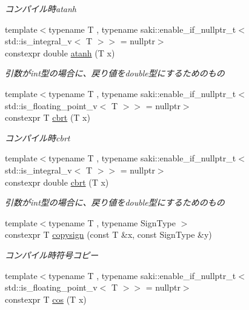 \begin{DoxyCompactItemize}
\begin{DoxyCompactList}\small\item\em コンパイル時atanh \end{DoxyCompactList}\item 
{\footnotesize template$<$typename T , typename saki\+::enable\+\_\+if\+\_\+nullptr\+\_\+t$<$ std\+::is\+\_\+integral\+\_\+v$<$ T $>$$>$  = nullptr$>$ }\\constexpr double \mbox{\hyperlink{namespacesaki_a1b7d87f99b61600e1201b10de467200f}{atanh}} (T x)
\begin{DoxyCompactList}\small\item\em 引数がint型の場合に、戻り値をdouble型にするためのもの \end{DoxyCompactList}\item 
{\footnotesize template$<$typename T , typename saki\+::enable\+\_\+if\+\_\+nullptr\+\_\+t$<$ std\+::is\+\_\+floating\+\_\+point\+\_\+v$<$ T $>$$>$  = nullptr$>$ }\\constexpr T \mbox{\hyperlink{namespacesaki_a8836c929b71a61cf0151d3b76eb7af15}{cbrt}} (T x)
\begin{DoxyCompactList}\small\item\em コンパイル時cbrt \end{DoxyCompactList}\item 
{\footnotesize template$<$typename T , typename saki\+::enable\+\_\+if\+\_\+nullptr\+\_\+t$<$ std\+::is\+\_\+integral\+\_\+v$<$ T $>$$>$  = nullptr$>$ }\\constexpr double \mbox{\hyperlink{namespacesaki_a5a3d1ab0508dcff1fb2e17a4ef8a855d}{cbrt}} (T x)
\begin{DoxyCompactList}\small\item\em 引数がint型の場合に、戻り値をdouble型にするためのもの \end{DoxyCompactList}\item 
{\footnotesize template$<$typename T , typename Sign\+Type $>$ }\\constexpr T \mbox{\hyperlink{namespacesaki_a8bab6303ac2144b883080f04ebe26a0e}{copysign}} (const T \&x, const Sign\+Type \&y)
\begin{DoxyCompactList}\small\item\em コンパイル時符号コピー \end{DoxyCompactList}\item 
{\footnotesize template$<$typename T , typename saki\+::enable\+\_\+if\+\_\+nullptr\+\_\+t$<$ std\+::is\+\_\+floating\+\_\+point\+\_\+v$<$ T $>$$>$  = nullptr$>$ }\\constexpr T \mbox{\hyperlink{namespacesaki_a82551963a8cab889ca6f76ed346d6f4f}{cos}} (T x)

\end{DoxyCompactItemize}
